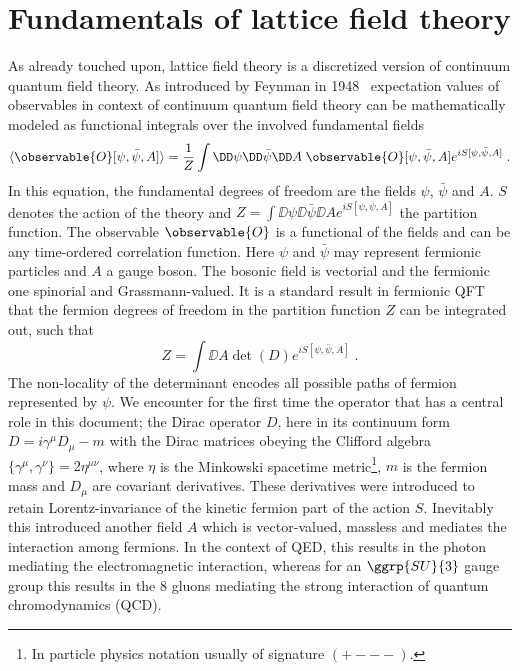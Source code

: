 \section{Fundamentals of lattice field theory}

As already touched upon, lattice field theory is a discretized version of continuum quantum field theory.
As introduced by Feynman in 1948~\cite{Feynman1948} expectation values of observables in context of continuum quantum field theory can be mathematically modeled as functional integrals over the involved fundamental fields
\begin{equation} \label{eq:path:integral:expectation:value}
\langle \observable{O}[\psi, \bar{\psi}, A] \rangle =
\frac{1}{Z} \int
\DD \psi
\DD \bar{\psi}
\DD A \;
\observable{O}[\psi, \bar{\psi}, A]
e^{i S[\psi, \bar{\psi}, A]} \;.
\end{equation}
In this equation, the fundamental degrees of freedom are the fields $\psi$, $\bar{\psi}$ and $A$.
$S$ denotes the action of the theory and $Z = \int \DD \psi \DD \bar{\psi} \DD A e^{i S[\psi, \bar{\psi}, A]}$ the partition function.
The observable $\observable{O}$ is a functional of the fields and can be any time-ordered correlation function.
Here $\psi$ and $\bar{\psi}$ may represent fermionic particles and $A$ a gauge boson.
The bosonic field is vectorial and the fermionic one spinorial and Grassmann-valued.
It is a standard result in fermionic QFT that the fermion degrees of freedom in the partition function $Z$ can be integrated out, such that
\begin{equation}
Z = \int \DD A \det(D) e^{i S[\psi, \bar{\psi}, A]} \;.
\end{equation}
The non-locality of the determinant encodes all possible paths of fermion represented by $\psi$.
We encounter for the first time the operator that has a central role in this document; the Dirac operator $D$, here in its continuum form $D = i \gamma^{\mu} D_{\mu} - m$ with the Dirac matrices obeying the Clifford algebra $\{\gamma^{\mu}, \gamma^{\nu}\} = 2 \eta^{\mu \nu}$, where $\eta$ is the Minkowski spacetime metric\footnote{In particle physics notation usually of signature $(+---)$.}, $m$ is the fermion mass and $D_{\mu}$ are covariant derivatives.
These derivatives were introduced to retain Lorentz-invariance of the kinetic fermion part of the action $S$.
Inevitably this introduced another field $A$ which is vector-valued, massless and mediates the interaction among fermions.
In the context of QED, this results in the photon mediating the electromagnetic interaction, whereas for an $\ggrp{SU}{3}$ gauge group this results in the 8 gluons mediating the strong interaction of quantum chromodynamics (QCD).

